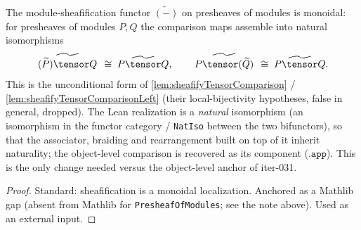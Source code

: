 \begin{lemma}
  \label{lem:sheafifyTensorComparison_uncond}
  The module-sheafification functor $\widetilde{(-)}$ on presheaves of modules is
  monoidal: for presheaves of modules $P, Q$ the comparison maps assemble into
  natural isomorphisms
  \[
    \widetilde{\,(\widetilde{P}) \tensor Q\,} \;\cong\; \widetilde{P \tensor Q},
    \qquad
    \widetilde{\,P \tensor (\widetilde{Q})\,} \;\cong\; \widetilde{P \tensor Q}.
  \]
  This is the unconditional form of \cref{lem:sheafifyTensorComparison} /
  \cref{lem:sheafifyTensorComparisonLeft} (their local-bijectivity hypotheses, false
  in general, dropped). The Lean realization is a \emph{natural} isomorphism
  (an isomorphism in the functor category / \texttt{NatIso} between the two bifunctors),
  so that the associator, braiding and rearrangement built on top of it inherit
  naturality; the object-level comparison is recovered as its component
  ($\texttt{.app}$). This is the only change needed versus the object-level anchor of
  iter-031.
  \begin{proof}
    Standard: sheafification is a monoidal localization. Anchored as a Mathlib gap
    (absent from Mathlib for \texttt{PresheafOfModules}; see the note above). Used as
    an external input.
  \end{proof}
\end{lemma}

